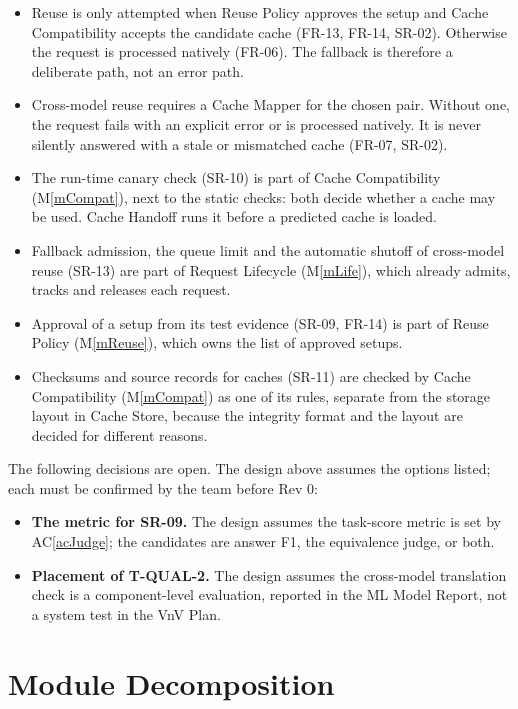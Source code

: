 \documentclass[12pt, titlepage]{article}
\newcommand{\acref}[1]{AC\ref{#1}}
\newcommand{\mref}[1]{M\ref{#1}}
\begin{document}
\begin{itemize}
\item Reuse is only attempted when Reuse Policy approves the setup and Cache
  Compatibility accepts the candidate cache (FR-13, FR-14, SR-02). Otherwise
  the request is processed natively (FR-06). The fallback is therefore a
  deliberate path, not an error path.
\item Cross-model reuse requires a Cache Mapper for the chosen pair. Without
  one, the request fails with an explicit error or is processed natively. It is
  never silently answered with a stale or mismatched cache (FR-07, SR-02).
\item The run-time canary check (SR-10) is part of Cache Compatibility
  (\mref{mCompat}), next to the static checks: both decide whether a cache may be
  used. Cache Handoff runs it before a predicted cache is loaded.
\item Fallback admission, the queue limit and the automatic shutoff of
  cross-model reuse (SR-13) are part of Request Lifecycle (\mref{mLife}), which
  already admits, tracks and releases each request.
\item Approval of a setup from its test evidence (SR-09, FR-14) is part of Reuse
  Policy (\mref{mReuse}), which owns the list of approved setups.
\item Checksums and source records for caches (SR-11) are checked by Cache
  Compatibility (\mref{mCompat}) as one of its rules, separate from the storage
  layout in Cache Store, because the integrity format and the layout are
  decided for different reasons.
\end{itemize}

\noindent The following decisions are open. The design above assumes the
options listed; each must be confirmed by the team before Rev 0:
\begin{itemize}
\item \textbf{The metric for SR-09.} The design assumes the task-score metric is
  set by \acref{acJudge}; the candidates are answer F1, the equivalence judge,
  or both.
\item \textbf{Placement of T-QUAL-2.} The design assumes the cross-model
  translation check is a component-level evaluation, reported in the ML Model
  Report, not a system test in the VnV Plan.
\end{itemize}

\section{Module Decomposition} \label{SecMD}
\end{document}
